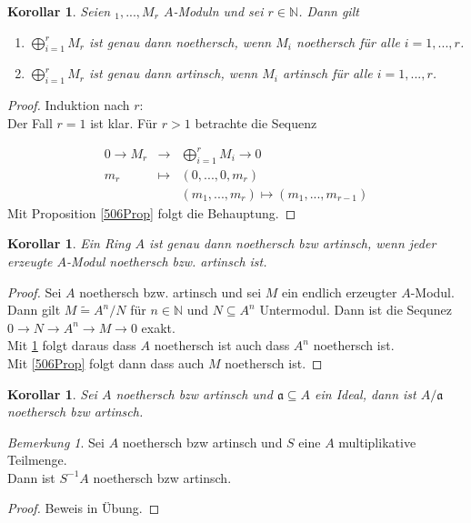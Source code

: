 \documentclass[10pt,a4paper]{article}
\newcommand{\N}{\ensuremath{\mathbb{N}}}
\newcommand{\isomorph}{\ensuremath{\tilde{=}}}
\newcounter{thm}[section]
\theoremstyle{definition}
\theoremstyle{plain}
\newtheorem{kor}[thm]{Korollar}
\theoremstyle{remark}
\newtheorem{bem}[thm]{Bemerkung}
\begin{document}
\begin{kor}
	\label{507Kor}
	Seien $_1,...,M_r$ $A$-Moduln und sei $r\in\N$. Dann gilt
	\begin{enumerate}
		\item $\bigoplus_{i=1}^rM_r$ ist genau dann noethersch, wenn $M_i$ noethersch für alle $i=1,...,r$.
		\item $\bigoplus_{i=1}^rM_r$ ist genau dann artinsch, wenn $M_i$ artinsch für alle $i=1,...,r$.
	\end{enumerate}
\end{kor}
\begin{proof}
	Induktion nach $r$:\\
	Der Fall $r=1$ ist klar. Für $r>1$ betrachte die Sequenz
	
	\[\begin{array}{rcl}
		0\rightarrow M_r &\rightarrow& \bigoplus_{i=1}^{r}M_i\rightarrow 0\\
		             m_r &\mapsto    & (0,...,0,m_r)                      \\
		                 &           & (m_1,...,m_r)         \mapsto      (m_1,...,m_{r-1})
	\end{array}\]
	Mit Proposition \ref{506Prop} folgt die Behauptung.
\end{proof}
\begin{kor}
	Ein Ring $A$ ist genau dann noethersch bzw artinsch, wenn jeder erzeugte $A$-Modul noethersch bzw. artinsch ist.
\end{kor}
\begin{proof}
	Sei $A$ noethersch bzw. artinsch und sei $M$ ein endlich erzeugter $A$-Modul. Dann gilt $M\isomorph A^n/N$ für $n\in\N$ und $N\subseteq A^n$ Untermodul. Dann ist die Sequnez $0\rightarrow N\rightarrow A^n\rightarrow M\rightarrow 0$ exakt.\\
	Mit \ref{507Kor} folgt daraus dass $A$ noethersch ist auch dass $A^n$ noethersch ist.\\
	Mit \ref{506Prop} folgt dann dass auch $M$ noethersch ist.
\end{proof}
\begin{kor}
	\label{509Kor}
	Sei $A$ noethersch bzw artinsch und $\mathfrak a\subseteq A$ ein Ideal, dann ist $A/\mathfrak a$ noethersch bzw artinsch.
\end{kor}
\begin{bem}
	Sei $A$ noethersch bzw artinsch und $S$  eine $A$ multiplikative Teilmenge.\\
	Dann ist $S^{-1}A$ noethersch bzw artinsch.
\end{bem}
\begin{proof}
	Beweis in Übung.
\end{proof}
\end{document}
